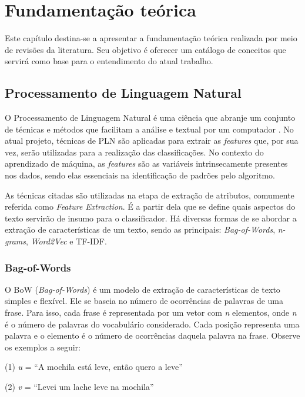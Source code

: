 \chapter[Fundamentação teórica]{Fundamentação teórica}

Este capítulo destina-se a apresentar a fundamentação teórica realizada por meio de revisões da literatura. Seu objetivo é oferecer um catálogo de conceitos que servirá como base para o entendimento do atual trabalho.

\section[Processamento de Linguagem	 Natural]{Processamento de Linguagem Natural}

O Processamento de Linguagem Natural é uma ciência que abranje um conjunto de técnicas e métodos que facilitam a análise e textual por um computador \cite{aranha}. 
No atual projeto, técnicas de PLN são aplicadas para extrair as \textit{features} que, por sua vez, serão utilizadas para a realização das classificações. No contexto do aprendizado de máquina, as \textit{features} são as variáveis intrinsecamente presentes nos dados, sendo elas essenciais na identificação de padrões pelo algoritmo.

As técnicas citadas são utilizadas na etapa de extração de atributos, comumente referida como \textit{Feature Extraction}. É a partir dela que se define quais aspectos do texto servirão de insumo para o classificador. Há diversas formas de se abordar a extração de características de um texto, sendo as principais: \textit{Bag-of-Words}, \textit{n-grams}, \textit{Word2Vec} e TF-IDF.

\subsection{Bag-of-Words}

O BoW (\textit{Bag-of-Words}) é um modelo de extração de características de texto simples e flexível. Ele se baseia no número de ocorrências de palavras de uma frase. Para isso, cada frase é representada por um vetor com \textit{n} elementos, onde \textit{n} é o número de palavras do vocabulário considerado. Cada posição representa uma palavra e o elemento é o número de ocorrências daquela palavra na frase. Observe os exemplos a seguir:

\begin{samepage}
(1) \textit{u} =  “A mochila está leve, então quero a leve”

\nopagebreak

(2) \textit{v} = “Levei um lache leve na mochila”
\end{samepage}

